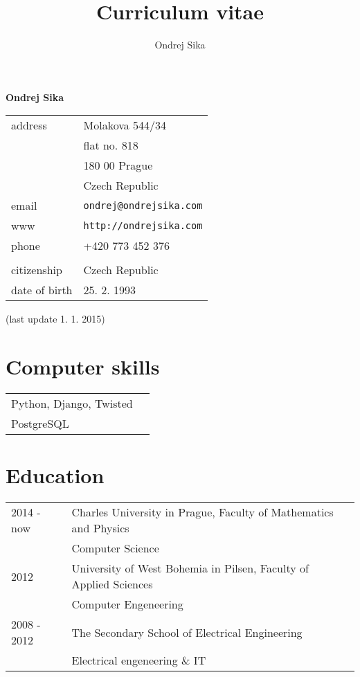 \documentclass[12pt,a4paper]{article}
\title{Curriculum vitae}
\author{Ondrej Sika}
\begin{document}
\begin{center}
{\LARGE \bf Ondrej Sika}\\
\vspace*{0.2cm}
\begin{tabular}{R{5cm}L{5cm}}
address & Molakova 544/34\\
 & flat no. 818\\
 & 180 00 Prague\\
 & Czech Republic\\
email & \texttt{ondrej@ondrejsika.com}\\
www & \texttt{http://ondrejsika.com}\\
phone & +420 773 452 376\\
\\
citizenship & Czech Republic\\
date of birth & 25. 2. 1993\\
\end{tabular}

\vspace*{0.2cm}
{\small (last update 1. 1. 2015)}
\end{center}

\section*{Computer skills}
\begin{tabular}{@{}ll}
Python, Django, Twisted & \\
PostgreSQL & \\
\end{tabular}

\section*{Education}
\begin{tabular}{@{}p{2cm}l}
2014 - now & Charles University in Prague, Faculty of Mathematics and Physics\\
 & Computer Science\\
2012  & University of West Bohemia in Pilsen, Faculty of Applied Sciences\\
 & Computer Engeneering\\
2008 - 2012 & The Secondary School of Electrical Engineering\\
 & Electrical engeneering \& IT\\
\end{tabular}
\end{document}
